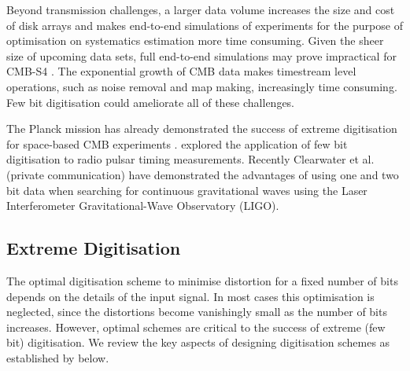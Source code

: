 \documentclass[apj]{emulateapj}
\begin{document}


Beyond transmission challenges, a larger data volume increases the size and cost of disk arrays and makes end-to-end simulations of experiments for the purpose of optimisation on systematics estimation more time consuming. Given the sheer size of upcoming data sets, full end-to-end simulations may prove impractical for CMB-S4 \citep{s4sciencebook}. The exponential growth of CMB data makes timestream level operations, such as noise removal and map making, increasingly time consuming. Few bit digitisation could ameliorate all of these challenges.



The Planck mission has already demonstrated the success of extreme digitisation for space-based CMB experiments \citep{maris2003}. \cite{jenet1998} explored the application of few bit digitisation to radio pulsar timing measurements. Recently Clearwater et al. (private communication) have demonstrated the advantages of using one and two bit data when searching for continuous gravitational waves using the Laser Interferometer Gravitational-Wave Observatory (LIGO).


\subsection{Extreme Digitisation}
\label{subsec:extremedigitisation}

The optimal digitisation scheme to minimise distortion for a fixed number of bits depends on the details of the input signal. 
In most cases this optimisation is neglected, since the distortions become vanishingly small as the number of bits increases. However, optimal schemes are critical to the success of extreme (few bit) digitisation. We review the key aspects of designing digitisation schemes as established by \cite{max1960} below.
\end{document}
